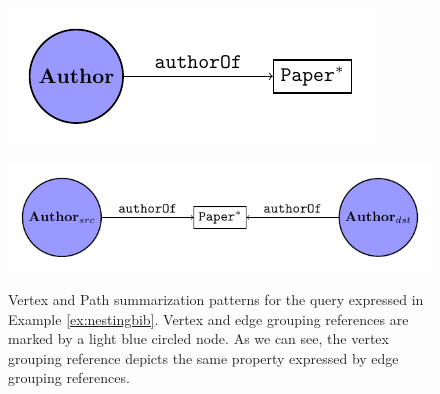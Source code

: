 \begin{figure}[!t]
	\centering
	\begin{minipage}[!t]{0.5\textwidth}
		\centering
		\includegraphics[width=.6\textwidth]{images/nesting/patterns/00_vertex_pattern.pdf}
		\label{fig:vertexPat}
	\end{minipage} \begin{minipage}[!t]{0.4\textwidth}
		\centering
		\includegraphics[width=1\textwidth]{images/nesting/patterns/00_path_pattern.pdf}
		\label{fig:pathPat}
	\end{minipage}
	\caption{Vertex and Path summarization patterns for the query expressed in Example \ref{ex:nestingbib}. Vertex and edge grouping references are marked by a light blue circled node. As we can see, the vertex grouping reference depicts the same property expressed by edge grouping references.}
	\label{fig:patterns}
\end{figure}
